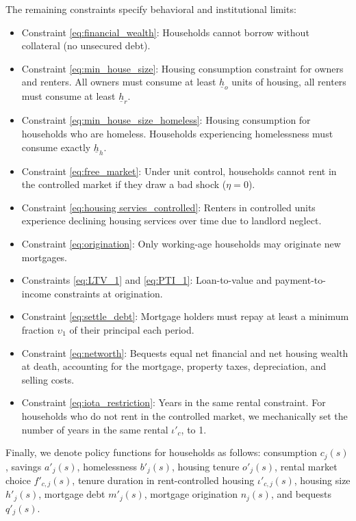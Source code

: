 \documentclass[parskip=full]{article}
\begin{document}
The remaining constraints specify behavioral and institutional limits: 
\begin{itemize}
    \item Constraint \eqref{eq:financial_wealth}: Households cannot borrow without collateral (no unsecured debt).
    \item Constraint \eqref{eq:min_house_size}: Housing consumption constraint for owners and renters. All owners must consume at least $\underline{h}_{o}$ units of housing, all renters must consume at least $\underline{h}_{r}$.
    \item Constraint \eqref{eq:min_house_size_homeless}: Housing consumption for households who are homeless. Households experiencing homelessness must consume exactly $\underline{h}_{h}$.
    \item Constraint \eqref{eq:free_market}: Under unit control, households cannot rent in the controlled market if they draw a bad shock ($\eta=0$).
    \item Constraint \eqref{eq:housing servies_controlled}: Renters in controlled units experience declining housing services over time due to landlord neglect. 
    \item Constraint \eqref{eq:origination}: Only working-age households may originate new mortgages.
    \item Constraints \eqref{eq:LTV_1} and \eqref{eq:PTI_1}: Loan-to-value and payment-to-income constraints at origination.
    \item Constraint \eqref{eq:settle_debt}: Mortgage holders must repay at least a minimum fraction $\upsilon_{1}$ of their principal each period.
    \item Constraint \eqref{eq:networth}: Bequests equal net financial and net housing wealth at death, accounting for the mortgage, property taxes, depreciation, and selling costs.
    \item Constraint \eqref{eq:iota_restriction}: Years in the same rental constraint. For households who do not rent in the controlled market, we mechanically set the number of years in the same rental $\iota'_{c}$, to 1.
\end{itemize} 

Finally, we denote policy functions for households as follows: consumption $c_{j}(s)$, savings $a'_{j}(s)$, homelessness $b'_{j}(s)$, housing tenure $o'_{j}(s)$, rental market choice $f'_{c,j}(s)$, tenure duration in rent-controlled housing $\iota'_{c,j}(s)$, housing size $h'_{j}(s)$, mortgage debt $m'_{j}(s)$, mortgage origination $n_{j}(s)$, and bequests $q'_{j}(s)$.
\end{document}

